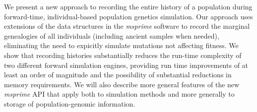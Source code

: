 \documentclass{article}
\begin{document}
We present a new approach to recording the entire history of a population during forward-time, individual-based
population genetics simulation.  Our approach uses extensions of the data structures in the \emph{msprime} software to
record the marginal genealogies of all individuals (including ancient samples when needed), eliminating the need to
expicitly simulate mutations not affecting fitness.  We show that recording histories substantially reduces the run-time
complexity of two different forward simulation engines, providing run time improvements of at least an order of
magnitude and the possibility of substantial reductions in memory requirements.  We will also describe more general
features of the new \emph{msprime} API that apply both to simulation methods and more generally to storage of
population-genomic information.
\end{document}
